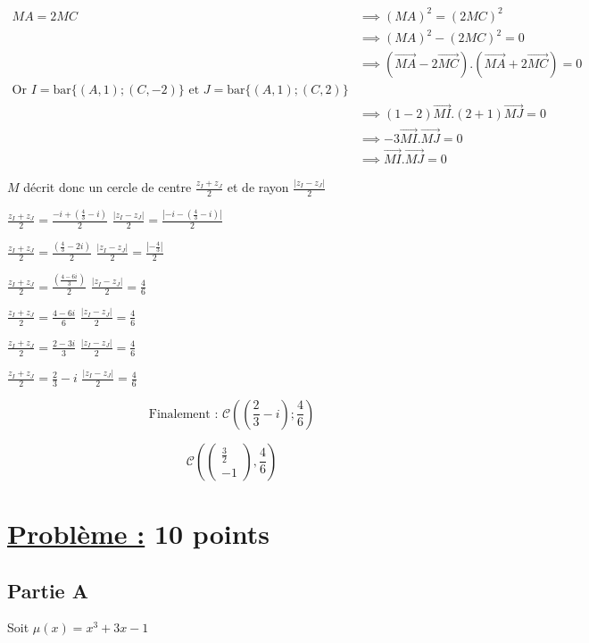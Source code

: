 \documentclass[12pt,a4paper]{article}
\begin{document}
\begin{enumerate}
\begin{align*}
MA =2MC &\implies (MA)^{2} =(2MC)^{2}\\
				&\implies (MA)^{2} -(2MC)^{2}=0\\
				&\implies (\overrightarrow{MA} - 2\overrightarrow{MC}).(\overrightarrow{MA} + 2\overrightarrow{MC}) = 0\\
\text{Or }  I = \text{bar}\{(A,1); (C,-2)\} \text{ et } J = \text{bar}\{(A,1); (C,2)\}\\
				&\implies (1-2)\overrightarrow{MI}.(2+1)\overrightarrow{MJ} = 0\\
				&\implies -3\overrightarrow{MI}.\overrightarrow{MJ} = 0\\
				&\implies \overrightarrow{MI}.\overrightarrow{MJ} = 0
\end{align*}

\( M \) décrit donc un cercle de centre $\frac{z_I+z_J}{2}$ et de rayon $\frac{|z_I-z_J|}{2}$

$ \frac{z_I+z_J}{2} = \frac{ -i+\left( \frac{4}{3} - i\right) }{2} $  $\frac{|z_I-z_J|}{2}=\frac{|-i-\left( \frac{4}{3} - i\right)|}{2} $

$ \frac{z_I+z_J}{2} = \frac{ \left( \frac{4}{3} - 2i\right) }{2} $  $\frac{|z_I-z_J|}{2}=\frac{|-\frac{4}{3}|}{2} $

$ \frac{z_I+z_J}{2} = \frac{ \left( \frac{4 - 6i}{3}\right) }{2} $  $\frac{|z_I-z_J|}{2}=\frac{4}{6} $

$ \frac{z_I+z_J}{2} = \frac{4 - 6i}{6} $  $\frac{|z_I-z_J|}{2}=\frac{4}{6} $

$ \frac{z_I+z_J}{2} = \frac{2 - 3i}{3} $  $\frac{|z_I-z_J|}{2}=\frac{4}{6} $

$ \frac{z_I+z_J}{2} = \frac{2}{3}-i $  $\frac{|z_I-z_J|}{2}=\frac{4}{6} $

$$ \text{Finalement : } \boxed{\mathcal{C}\left( \left( \frac{2}{3}-i \right)  ;\frac{4}{6}\right)} $$

$$ \boxed{\mathcal{C} \left( \begin{pmatrix} \frac{3}{2} \\ -1 \end{pmatrix}, \frac{4}{6} \right)} $$
\end{enumerate}

\section*{\underline{Problème :} 10 points}

\subsection*{Partie A}
Soit \( \mu(x) = x^3 + 3x - 1 \)
\end{document}
